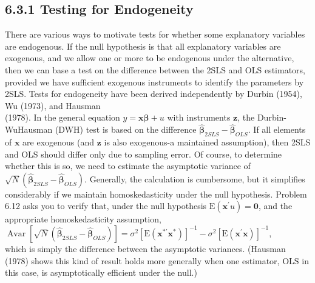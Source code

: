 \documentclass[10pt]{article}
\begin{document}
\subsection*{6.3.1 Testing for Endogeneity}
There are various ways to motivate tests for whether some explanatory variables are endogenous. If the null hypothesis is that all explanatory variables are exogenous, and we allow one or more to be endogenous under the alternative, then we can base a test on the difference between the 2SLS and OLS estimators, provided we have sufficient exogenous instruments to identify the parameters by 2SLS. Tests for endogeneity have been derived independently by Durbin (1954), Wu (1973), and Hausman\\
(1978). In the general equation $y=\mathbf{x} \boldsymbol{\beta}+u$ with instruments $\mathbf{z}$, the Durbin-WuHausman (DWH) test is based on the difference $\hat{\boldsymbol{\beta}}_{2 S L S}-\hat{\boldsymbol{\beta}}_{O L S}$. If all elements of $\mathbf{x}$ are exogenous (and $\mathbf{z}$ is also exogenous-a maintained assumption), then 2SLS and OLS should differ only due to sampling error. Of course, to determine whether this is so, we need to estimate the asymptotic variance of $\sqrt{N}\left(\hat{\boldsymbol{\beta}}_{2 S L S}-\hat{\boldsymbol{\beta}}_{O L S}\right)$. Generally, the calculation is cumbersome, but it simplifies considerably if we maintain homoskedasticity under the null hypothesis. Problem 6.12 asks you to verify that, under the null hypothesis $\mathrm{E}\left(\mathbf{x}^{\prime} u\right)=\mathbf{0}$, and the appropriate homoskedasticity assumption,\\
$\operatorname{Avar}\left[\sqrt{N}\left(\hat{\boldsymbol{\beta}}_{2 S L S}-\hat{\boldsymbol{\beta}}_{O L S}\right)\right]=\sigma^{2}\left[\mathrm{E}\left(\mathbf{x}^{* \prime} \mathbf{x}^{*}\right)\right]^{-1}-\sigma^{2}\left[\mathrm{E}\left(\mathbf{x}^{\prime} \mathbf{x}\right)\right]^{-1}$,\\
which is simply the difference between the asymptotic variances. (Hausman (1978) shows this kind of result holds more generally when one estimator, OLS in this case, is asymptotically efficient under the null.)
\end{document}
